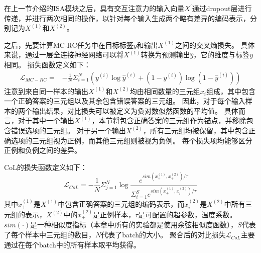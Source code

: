 在上一节介绍的ISA模块之后，具有交互注意力的输入向量$X^{'}$通过dropout层进行传递，并进行两次相同的操作，以针对每个输入生成两个略有差异的编码表示，分别记为$X^{(1)}$和$X^{(2)}$。

之后，先要计算MC-RC任务中在目标标签$y$和输出$X^{(1)}$之间的交叉熵损失。
具体来说，通过一层全连接神经网络可以将$X^{(1)}$转换为预测输出$\hat y$，它的维度与标签$y$相同。
损失函数定义如下：
\begin{equation}
    \begin{split}
    \mathcal L_{MC-RC}=& -\frac{1}{N}\Sigma^N_{i=1}(y^{(i)}\log\hat y^{(i)}+(1-y^{(i)})\log(1-\hat y^{(i)}))
    \end{split}
\end{equation}
注意到来自同一样本的输出$X^{(1)}$和$X^{(2)}$均由相同数量的三元组$x_i$组成，其中包含一个正确答案的三元组以及其余包含错误答案的三元组。
因此，对于每个输入样本的两个输出结果，对比损失可以被定义为负对数似然函数的平均值。
具体而言，对于其中一个输出$X^{(1)}$，本节将包含正确答案的三元组作为锚点，并移除包含错误选项的三元组。
对于另一个输出$X^{(2)}$，所有三元组均被保留，其中包含正确选项的三元组视为正例，而其他三元组则被视为负例。
每个损失项均能够区分正例和负例之间的差异。

CoL的损失函数定义如下：
\begin{equation}
    \mathcal L_{CoL}=-\frac{1}{N}\Sigma^N_{j=1}\log \frac{e^{sim(x^{(1)}_+,x^{(2)}_+)/ \tau}}{\Sigma^S_{i=1} e^{sim(x^{(1)}_+,x^{(2)}_i)/ \tau}}
\end{equation}
其中$x^{(1)}_+$是$X^{(1)}$中包含正确答案的三元组的编码表示，而$x^{(2)}_i$是$X^{(2)}$中所有三元组的表示，$X^{(2)}$中的$x^{(2)}_+$是正例样本，$\tau$是可配置的超参数，温度系数。
$sim(\cdot)$是一种相似度指标（本章中所有的实验都是使用余弦相似度函数），$S$代表了每个样本中三元组的数目，$N$代表了batch的大小。
聚合后的对比损失$\mathcal L_{CoL}$主要通过在每个batch中的所有样本取平均获得。


